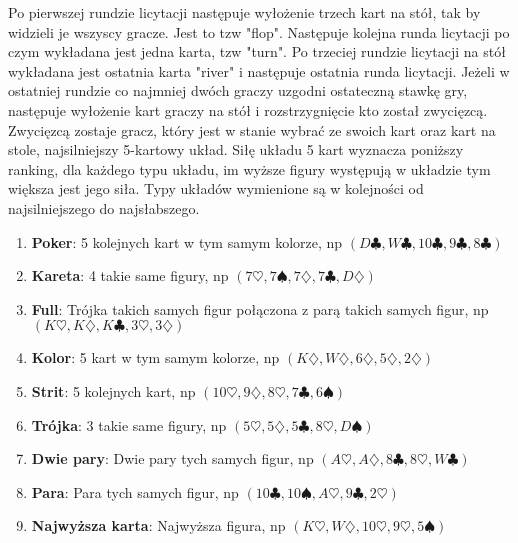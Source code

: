 \documentclass[licencjacka]{pracamgr}
\begin{document}
\noindent
Po pierwszej rundzie licytacji następuje wyłożenie trzech kart na stół, tak by widzieli je wszyscy gracze.
Jest to tzw "flop". Następuje kolejna runda licytacji po czym wykładana jest jedna karta, tzw "turn".
Po trzeciej rundzie licytacji na stół wykładana jest ostatnia karta "river" i następuje ostatnia runda
licytacji. Jeżeli w ostatniej rundzie co najmniej dwóch graczy uzgodni ostateczną stawkę gry, następuje
wyłożenie kart graczy na stół i rozstrzygnięcie kto został zwycięzcą. \\

\noindent
Zwycięzcą zostaje gracz, który jest w stanie wybrać ze swoich kart oraz kart na stole, najsilniejszy
5-kartowy układ. Siłę układu 5 kart wyznacza poniższy ranking, dla każdego typu układu, im wyższe
figury występują w układzie tym większa jest jego siła. Typy układów wymienione są w kolejności
od najsilniejszego do najsłabszego.

\begin{enumerate}
\item \textbf{Poker}: 5 kolejnych kart w tym samym kolorze, np $(D\clubsuit, W\clubsuit, 10\clubsuit, 9\clubsuit, 8\clubsuit)$ 
\item \textbf{Kareta}: 4 takie same figury, np $(7\heartsuit, 7\spadesuit, 7\diamondsuit, 7\clubsuit, D\diamondsuit)$
\item \textbf{Full}: Trójka takich samych figur połączona z parą takich samych figur, np $(K\heartsuit, K\diamondsuit, K\clubsuit, 3\heartsuit, 3\diamondsuit)$ 
\item \textbf{Kolor}: 5 kart w tym samym kolorze, np $(K\diamondsuit, W\diamondsuit, 6\diamondsuit, 5\diamondsuit, 2\diamondsuit)$
\item \textbf{Strit}: 5 kolejnych kart, np $(10\heartsuit, 9\diamondsuit, 8\heartsuit, 7\clubsuit, 6\spadesuit)$
\item \textbf{Trójka}: 3 takie same figury, np $(5\heartsuit, 5\diamondsuit, 5\clubsuit, 8\heartsuit, D\spadesuit)$
\item \textbf{Dwie pary}: Dwie pary tych samych figur, np $(A\heartsuit, A\diamondsuit, 8\clubsuit, 8\heartsuit, W\clubsuit)$
\item \textbf{Para}: Para tych samych figur, np $(10\clubsuit, 10\spadesuit, A\heartsuit, 9\clubsuit, 2\heartsuit)$
\item \textbf{Najwyższa karta}: Najwyższa figura, np $(K\heartsuit, W\diamondsuit, 10\heartsuit, 9\heartsuit, 5\spadesuit)$
\end{enumerate}
\end{document}
